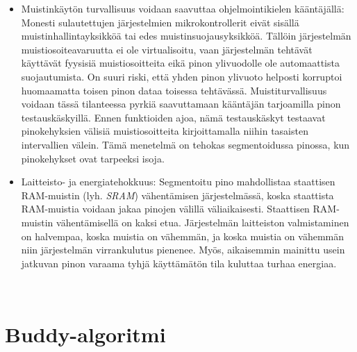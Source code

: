 \begin{itemize}
    \item{Muistinkäytön turvallisuus voidaan saavuttaa ohjelmointikielen kääntäjällä: Monesti sulautettujen järjestelmien mikrokontrollerit eivät sisällä muistinhallintayksikköä tai edes muistinsuojausyksikköä. Tällöin järjestelmän muistiosoiteavaruutta ei ole virtualisoitu, vaan järjestelmän tehtävät käyttävät fyysisiä muistiosoitteita eikä pinon ylivuodolle ole automaattista suojautumista. On suuri riski, että yhden pinon ylivuoto helposti korruptoi huomaamatta toisen pinon dataa toisessa tehtävässä. Muistiturvallisuus voidaan tässä tilanteessa pyrkiä saavuttamaan kääntäjän tarjoamilla pinon testauskäskyillä. Ennen funktioiden ajoa, nämä testauskäskyt testaavat pinokehyksien välisiä muistiosoitteita kirjoittamalla niihin tasaisten intervallien välein. Tämä menetelmä on tehokas segmentoidussa pinossa, kun pinokehykset ovat tarpeeksi isoja.}\cite{bsstes@2023}
    \item{Laitteisto- ja energiatehokkuus: Segmentoitu pino mahdollistaa staattisen RAM-muistin (lyh. \textit{SRAM}) vähentämisen järjestelmässä, koska staattista RAM-muistia voidaan jakaa pinojen välillä väliaikaisesti. Staattisen RAM-muistin vähentämisellä on kaksi etua. Järjestelmän laitteiston valmistaminen on halvempaa, koska muistia on vähemmän, ja koska muistia on vähemmän niin järjestelmän virrankulutus pienenee. Myös, aikaisemmin mainittu usein jatkuvan pinon varaama tyhjä käyttämätön tila kuluttaa turhaa energiaa.}\cite{bsstes@2023}
\end{itemize}

~\\

\section{Buddy-algoritmi}

